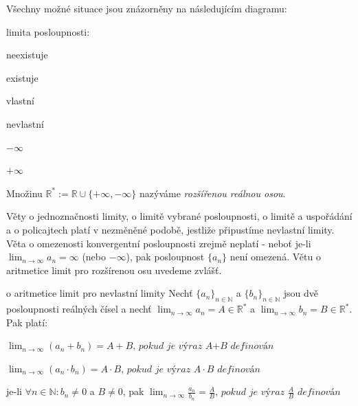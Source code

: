 \begin{poznamka}
Všechny možné situace jsou znázorněny na následujícím diagramu:

limita posloupnosti:
\begin{pitemize}
	\item neexistuje
	\item existuje
	\begin{pitemize}
		\item vlastní
		\item nevlastní
		\begin{pitemize}
			\item $- \infty$
			\item $+ \infty$
		\end{pitemize}
	\end{pitemize}
\end{pitemize}

\end{poznamka}

\begin{definice}
Množinu $\mathbb{R}^* := \mathbb{R} \cup \{ + \infty, - \infty \}$ nazýváme \emph{rozšířenou reálnou osou}.
\end{definice}

\begin{poznamka}
Věty o jednoznačnosti limity, o limitě vybrané posloupnosti, o limitě a uspořádání a o policajtech platí v nezměněné podobě, jestliže připustíme nevlastní limity. Věta o omezenosti konvergentní posloupnosti zrejmě neplatí - neboť je-li $\lim_{n \rightarrow \infty} a_n=\infty$ (nebo $- \infty$), pak posloupnost $\{a_n\}$ není omezená. Větu o aritmetice limit pro rozšírenou osu uvedeme zvlášť.
\end{poznamka}

\begin{vetaN}{o aritmetice limit pro nevlastní limity}
Nechť $\{a_n\}_{n \in \mathbb{N}}$ a $\{b_n\}_{n \in \mathbb{N}}$ jsou dvě posloupnosti reálných čísel a nechť $\lim_{n \rightarrow \infty} a_n = A \in \mathbb{R}^*$ a $\lim_{n \rightarrow \infty} b_n = B \in \mathbb{R}^*$. Pak platí:
\begin{penumerate}
	\item $\lim_{n \rightarrow \infty} (a_n+b_n) = A+B \textit{, pokud je výraz A+B definován}$
	\item $\lim_{n \rightarrow \infty} (a_n \cdot  b_n) = A\cdot B\textit{, pokud je výraz }A\cdot B\textit{ definován}$
	\item je-li $\forall n \in \mathbb{N}: b_n \neq 0$ a $B \neq 0$, pak $\lim_{n \rightarrow \infty} \frac{a_n}{b_n}=\frac{A}{B} \textit{, pokud je výraz } \frac{A}{B} \textit{ definován}$
\end{penumerate}
\end{vetaN}

